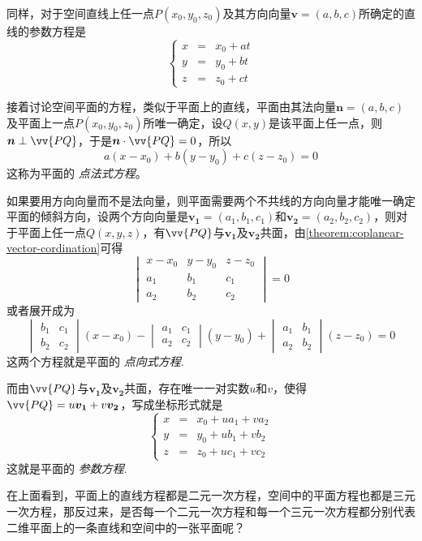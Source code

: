 同样，对于空间直线上任一点$P(x_0,y_0,z_0)$及其方向向量$\bm{v}=(a,b,c)$所确定的直线的参数方程是
\[ \left\{
    \begin{array}{lll}
      x & = & x_0 + at \\
      y & = & y_0 + bt \\
      z & = & z_0 + ct
    \end{array}
  \right. \]

接着讨论空间平面的方程，类似于平面上的直线，平面由其法向量$\bm{n}=(a,b,c)$及平面上一点$P(x_0,y_0,z_0)$所唯一确定，设$Q(x,y)$是该平面上任一点，则$\bm{n} \perp \vv{PQ}$，于是$\bm{n} \cdot \vv{PQ}=0$，所以
\[ a(x-x_0)+b(y-y_0)+c(z-z_0)=0 \]
这称为平面的 \emph{点法式方程}。

如果要用方向向量而不是法向量，则平面需要两个不共线的方向向量才能唯一确定平面的倾斜方向，设两个方向向量是$\bm{v_1}=(a_1,b_1,c_1)$和$\bm{v_2}=(a_2,b_2,c_2)$，则对于平面上任一点$Q(x,y,z)$，有$\vv{PQ}$与$\bm{v_1}$及$\bm{v_2}$共面，由\autoref{theorem:coplanear-vector-cordination}可得
\[
  \begin{vmatrix}
    x-x_0 & y-y_0 & z-z_0 \\
    a_1 & b_1 & c_1 \\
    a_2 & b_2 & c_2
  \end{vmatrix}
  =0
\]
或者展开成为
\[
  \begin{vmatrix}
    b_1 & c_1 \\
    b_2 & c_2
  \end{vmatrix}
  (x-x_0) -
  \begin{vmatrix}
    a_1 & c_1 \\
    a_2 & c_2
  \end{vmatrix}
  (y-y_0) +
  \begin{vmatrix}
    a_1 & b_1 \\
    a_2 & b_2
  \end{vmatrix}
  (z-z_0) = 0
\]
这两个方程就是平面的 \emph{点向式方程}.

而由$\vv{PQ}$与$\bm{v_1}$及$\bm{v_2}$共面，存在唯一一对实数$u$和$v$，使得$\vv{PQ}=u \bm{v_1} + v \bm{v_2}$，写成坐标形式就是
\[
  \left\{
    \begin{array}{lll}
      x & = & x_0 + u a_1 + v a_2 \\
      y & = & y_0 + u b_1 + v b_2 \\
      z & = & z_0 + u c_1 + v c_2
    \end{array}
    \right.
\]
这就是平面的 \emph{参数方程}.

在上面看到，平面上的直线方程都是二元一次方程，空间中的平面方程也都是三元一次方程，那反过来，是否每一个二元一次方程和每一个三元一次方程都分别代表二维平面上的一条直线和空间中的一张平面呢？

